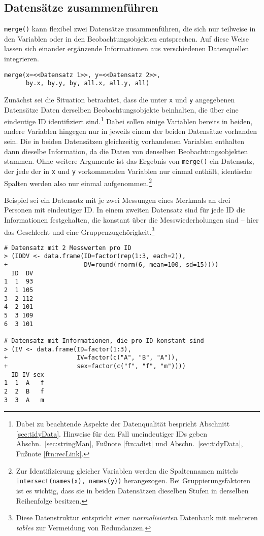 \subsection{Datensätze zusammenführen}
\label{sec:merge}

\lstinline!merge()! kann flexibel zwei Datensätze zusammenführen, die sich nur teilweise in den Variablen oder in den Beobachtungsobjekten entsprechen. Auf diese Weise lassen sich einander ergänzende Informationen aus verschiedenen Datenquellen integrieren.
\begin{lstlisting}
merge(x=<<Datensatz 1>>, y=<<Datensatz 2>>,
      by.x, by.y, by, all.x, all.y, all)
\end{lstlisting}

Zunächst sei die Situation betrachtet, dass die unter \lstinline!x! und \lstinline!y! angegebenen Datensätze Daten derselben Beobachtungsobjekte beinhalten, die über eine eindeutige ID identifiziert sind.\footnote{Dabei zu beachtende Aspekte der Datenqualität bespricht Abschnitt \ref{sec:tidyData}. Hinweise für den Fall uneindeutiger IDs geben Abschn.\ \ref{sec:stringMan}, Fußnote \ref{ftn:adist} und Abschn.\ \ref{sec:tidyData}, Fußnote \ref{ftn:recLink}.} Dabei sollen einige Variablen bereits in beiden, andere Variablen hingegen nur in jeweils einem der beiden Datensätze vorhanden sein. Die in beiden Datensätzen gleichzeitig vorhandenen Variablen enthalten dann dieselbe Information, da die Daten von denselben Beobachtungsobjekten stammen. Ohne weitere Argumente ist das Ergebnis von \lstinline!merge()! ein Datensatz, der jede der in \lstinline!x! und \lstinline!y! vorkommenden Variablen nur einmal enthält, identische Spalten werden also nur einmal aufgenommen.\footnote{Zur Identifizierung gleicher Variablen werden die Spaltennamen mittels \lstinline!intersect(names(x), names(y))! herangezogen. Bei Gruppierungsfaktoren ist es wichtig, dass sie in beiden Datensätzen dieselben Stufen in derselben Reihenfolge besitzen.}

Beispiel sei ein Datensatz mit je zwei Messungen eines Merkmals an drei Personen mit eindeutiger ID. In einem zweiten Datensatz sind für jede ID die Informationen festgehalten, die konstant über die Messwiederholungen sind -- hier das Geschlecht und eine Gruppenzugehörigkeit.\footnote{Diese Datenstruktur entspricht einer \emph{normalisierten} Datenbank mit mehreren \emph{tables} zur Vermeidung von Redundanzen.}
\begin{lstlisting}
# Datensatz mit 2 Messwerten pro ID
> (IDDV <- data.frame(ID=factor(rep(1:3, each=2)),
+                     DV=round(rnorm(6, mean=100, sd=15))))
  ID  DV
1  1  93
2  1 105
3  2 112
4  2 101
5  3 109
6  3 101

# Datensatz mit Informationen, die pro ID konstant sind
> (IV <- data.frame(ID=factor(1:3),
+                   IV=factor(c("A", "B", "A")),
+                   sex=factor(c("f", "f", "m"))))
  ID IV sex
1  1  A   f
2  2  B   f
3  3  A   m
\end{lstlisting}

